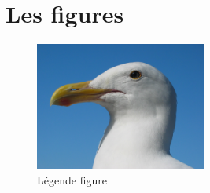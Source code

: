\section{Les figures}


\begin{figure}[H]
	\centering
	\includegraphics[width=0.5\textwidth]{images/gull}	
    \caption{Légende figure}
    \label{fig:label_figure}
\end{figure}



